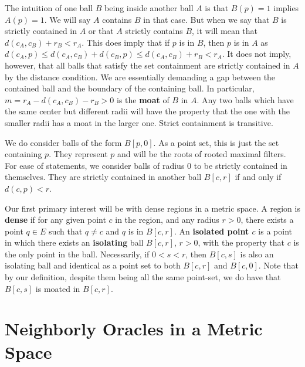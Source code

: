 \documentclass[12pt]{article}
\begin{document}
The intuition of one ball $B$ being inside another ball $A$ is that  $B(p) = 1$ implies $A(p) = 1$. We will say $A$ contains $B$ in that case. But when we say that $B$ is strictly contained in $A$ or that $A$ strictly contains $B$, it will mean that $d(c_A, c_B) + r_B < r_A$. This does imply that if $p$ is in $B$, then $p$ is in $A$ as $d(c_A, p) \leq d(c_A, c_B) + d(c_B, p) \leq d(c_A,c_B) + r_B < r_A$. It does not imply, however, that all balls that satisfy the set containment are strictly contained in $A$ by the distance condition. We are essentially demanding a gap between the contained ball and the boundary of the containing ball. In particular, $m = r_A - d(c_A,c_B) - r_B > 0$ is the \textbf{moat} of $B$ in $A$. Any two balls which have the same center but different radii will have the property that the one with the smaller radii has a moat in the larger one. Strict containment is transitive.

We do consider balls of the form $B[p, 0]$. As a point set, this is just the set containing $p$. They represent $p$ and will be the roots of rooted maximal filters.  For ease of statements, we consider balls of radius 0 to be strictly contained in themselves. They are strictly contained in another ball $B[c, r]$ if and only if $d(c, p) < r$. 

Our first primary interest will be with dense regions in a metric space. A region is \textbf{dense} if for any given point $c$ in the region, and any radius $r>0$, there exists a point $q \in E$ such that $q \neq c$ and $q$ is in $B[c,r]$. An \textbf{isolated point $c$} is a point in which there exists an \textbf{isolating} ball $B[c, r]$, $r > 0$, with the property that $c$ is the only point in the ball. Necessarily, if $0 < s < r$, then $B[c, s]$ is also an isolating ball and identical as a point set to both $B[c,r]$ and $B[c,0]$. Note that by our definition, despite them being all the same point-set, we do have that $B[c,s]$ is moated in $B[c,r]$.



\section{Neighborly Oracles in a Metric Space}
\end{document}
